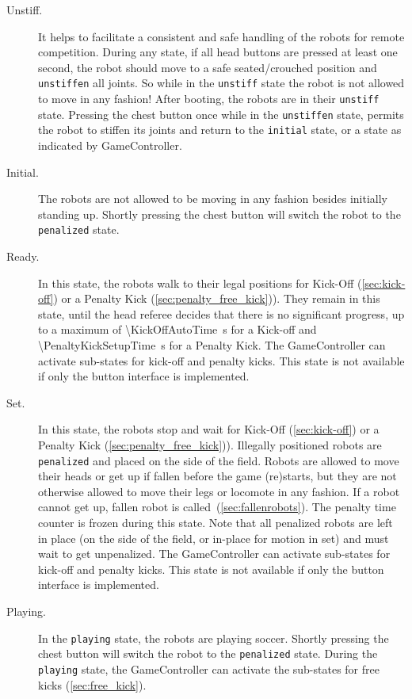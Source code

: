 \begin{description}
  \item [Unstiff.] It helps to facilitate a consistent and safe handling of the robots for remote competition. During any state, if all head buttons are pressed at least one second, the robot should move to a safe seated/crouched position and \texttt{unstiffen} all joints. So while in the \texttt{unstiff} state the robot is not allowed to move in any fashion! After booting, the robots are in their \texttt{unstiff} state. Pressing the chest button once while in the \texttt{unstiffen} state, permits the robot to stiffen its joints and return to the \texttt{initial} state, or a state as indicated by GameController.

  \item[Initial.] The robots are not allowed to be moving in any fashion besides initially standing up. Shortly pressing the chest button will switch the robot to the \texttt{penalized} state.

  \item[Ready.] In this state, the robots walk to their legal positions for Kick-Off  (\cf \cref{sec:kick-off}) or a Penalty Kick (\cf \cref{sec:penalty_free_kick})). They remain in this state, until the head referee decides that there is no significant progress, up to a maximum of \qty{\KickOffAutoTime}{\second} for a Kick-off and \qty{\PenaltyKickSetupTime}{\second} for a Penalty Kick.
  The GameController can activate sub-states for kick-off and penalty kicks.
  This state is not available if only the button interface is implemented.

  \item[Set.] In this state, the robots stop and wait for Kick-Off  (\cf \cref{sec:kick-off}) or a Penalty Kick (\cf \cref{sec:penalty_free_kick})).
  Illegally positioned robots are \texttt{penalized} and placed on the side of the field.
  Robots are allowed to move their heads or get up if fallen before the game (re)starts, but they are not otherwise allowed to move their legs or locomote in any fashion.
  If a robot cannot get up, fallen robot is called~(\cf \cref{sec:fallenrobots}).
  The penalty time counter is frozen during this state.
  Note that all penalized robots are left in place (on the side of the field, or in-place for motion in set) and must wait to get unpenalized.
  The GameController can activate sub-states for kick-off and penalty kicks.
  This state is not available if only the button interface is implemented.

  \item[Playing.] In the \texttt{playing} state, the robots are playing soccer. Shortly pressing the chest button will switch the robot to the \texttt{penalized} state. During the \texttt{playing} state, the GameController can activate the sub-states for free kicks (\cf \cref{sec:free_kick}).


\end{description}
